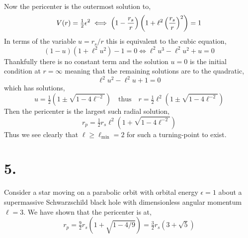 \documentclass[12pt]{article}
\begin{document}
\bigskip\\
Now the pericenter is the outermost solution to,
\[ V(r) = \tfrac{1}{2} \epsilon^2 \iff \left( 1 - \frac{r_s}{r} \right) \left(1 + \ell^2 \left( \frac{r_s}{r} \right)^2 \right) = 1 \]
In terms of the variable $u = r_s / r$ this is equivalent to the cubic equation,
\[ (1 - u)(1 + \ell^2 u^2) - 1 = 0 \iff  \ell^2 u^3 - \ell^2 u^2 + u = 0 \]
Thankfully there is no constant term and the solution $u = 0$ is the initial condition at $r = \infty$ meaning that the remaining solutions are to the quadratic,
\[ \ell^2 u^2 - \ell^2 u + 1 = 0 \]
which has solutions,
\[ u = \tfrac{1}{2} (1 \pm \sqrt{1 - 4 \ell^{-2}}) \quad \text{thus} \quad r = \tfrac{1}{2} \ell^2 (1 \pm \sqrt{1 - 4 \ell^{-2}}) \]
Then the pericenter is the largest such radial solution,
\[ r_p = \tfrac{1}{2} r_s \ell^2 (1 + \sqrt{1 - 4 \ell^{-2}}) \]
Thus we see clearly that $\ell \ge \ell_{\text{min}} = 2$ for such a turning-point to exist. 

\section*{5.}

Consider a star moving on a parabolic orbit with orbital energy $\epsilon = 1$ about a supermassive Schwarzschild black hole with dimensionless angular momentum $\ell = 3$. We have shown that the pericenter is at,
\[ r_p = \tfrac{9}{2} r_s (1 + \sqrt{1 - 4/9}) = \tfrac{3}{2} r_s (3 + \sqrt{5}) \]  
\end{document}
